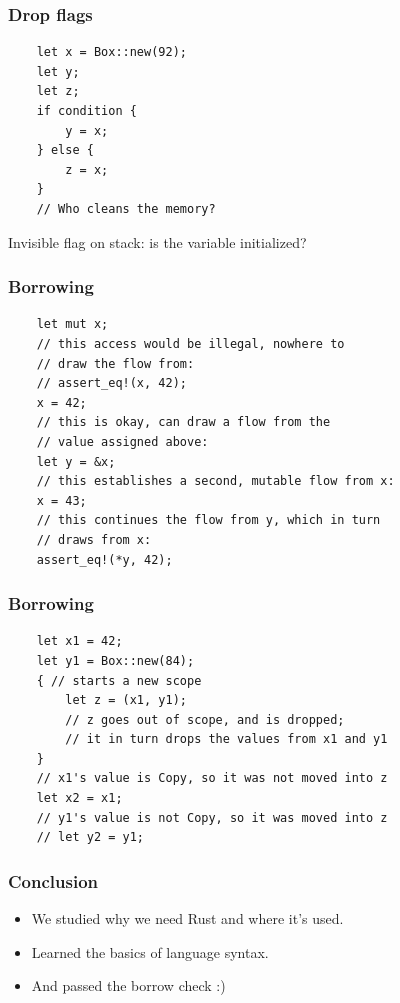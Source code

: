 \documentclass[aspectratio=1610,t]{beamer}
\begin{document}

\begin{frame}[fragile]
\frametitle{Drop flags}
\begin{verbatim}
    let x = Box::new(92);
    let y;
    let z;
    if condition {
        y = x;
    } else {
        z = x;
    }
    // Who cleans the memory?
\end{verbatim}

Invisible flag on stack: is the variable initialized?
\end{frame}


\begin{frame}[fragile]
\frametitle{Borrowing}
\begin{verbatim}
    let mut x;
    // this access would be illegal, nowhere to
    // draw the flow from:
    // assert_eq!(x, 42);
    x = 42;
    // this is okay, can draw a flow from the
    // value assigned above:
    let y = &x;
    // this establishes a second, mutable flow from x:
    x = 43;
    // this continues the flow from y, which in turn
    // draws from x:
    assert_eq!(*y, 42);
\end{verbatim}
\end{frame}


\begin{frame}[fragile]
\frametitle{Borrowing}
\begin{verbatim}
    let x1 = 42;
    let y1 = Box::new(84);
    { // starts a new scope
        let z = (x1, y1);
        // z goes out of scope, and is dropped;
        // it in turn drops the values from x1 and y1
    }
    // x1's value is Copy, so it was not moved into z
    let x2 = x1;
    // y1's value is not Copy, so it was moved into z
    // let y2 = y1;
\end{verbatim}
\end{frame}


\begin{frame}[fragile]
\frametitle{Conclusion}
\begin{itemize}
    \item We studied why we need Rust and where it's used.
    \item Learned the basics of language syntax.
    \item And passed the borrow check :)
\end{itemize}
\end{frame}

\end{document}
